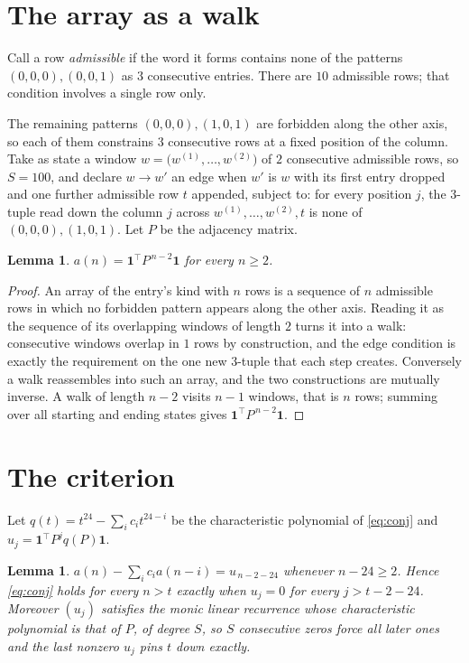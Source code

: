 \documentclass[11pt,a4paper]{article}
\theoremstyle{plain}
\newtheorem{lemma}[theorem]{Lemma}
\theoremstyle{definition}
\begin{document}
\section{The array as a walk}

Call a row \emph{admissible} if the word it forms contains none of the patterns
$(0,0,0), (0,0,1)$ as $3$ consecutive entries. There are $10$ admissible rows; that condition
involves a single row only.

The remaining patterns $(0,0,0), (1,0,1)$ are forbidden along the other axis, so each of them
constrains $3$ consecutive rows at a fixed position of the column. Take as state a
window $w=\bigl(w^{(1)},\dots,w^{(2)}\bigr)$ of $2$ consecutive admissible
rows, so $S=100$, and declare $w\to w'$ an edge when $w'$ is $w$ with its first entry
dropped and one further admissible row $t$ appended, subject to: for every position
$j$, the $3$-tuple read down the column $j$ across $w^{(1)},\dots,w^{(2)},t$
is none of $(0,0,0), (1,0,1)$. Let $P$ be the adjacency matrix.

\begin{lemma}\label{lem:walk}
$a(n)=\mathbf{1}^{\!\top}P^{\,n-2}\mathbf{1}$ for every $n\ge2$.
\end{lemma}

\begin{proof}
An array of the entry's kind with $n$ rows is a sequence of $n$ admissible rows in
which no forbidden pattern appears along the other axis. Reading it as the sequence of its
overlapping windows of length $2$ turns it into a walk: consecutive windows overlap in
$1$ rows by construction, and the edge condition is exactly the requirement on the one
new $3$-tuple that each step creates. Conversely a walk reassembles into such an array,
and the two constructions are mutually inverse. A walk of length $n-2$ visits $n-1$
windows, that is $n$ rows; summing over all starting and ending states gives
$\mathbf{1}^{\!\top}P^{\,n-2}\mathbf{1}$.
\end{proof}

\section{The criterion}

Let $q(t)=t^{24}-\sum_i c_i t^{24-i}$ be the characteristic polynomial of
\eqref{eq:conj} and $u_j=\mathbf{1}^{\!\top}P^{j}q(P)\mathbf{1}$.

\begin{lemma}\label{lem:crit}
$a(n)-\sum_i c_i a(n-i)=u_{\,n-2-24}$ whenever $n-24\ge2$. Hence
\eqref{eq:conj} holds for every $n>t$ exactly when $u_j=0$ for every
$j>t-2-24$. Moreover $(u_j)$ satisfies the monic linear recurrence whose
characteristic polynomial is that of $P$, of degree $S$, so $S$ consecutive zeros force all
later ones and the last nonzero $u_j$ pins $t$ down exactly.
\end{lemma}
\end{document}

